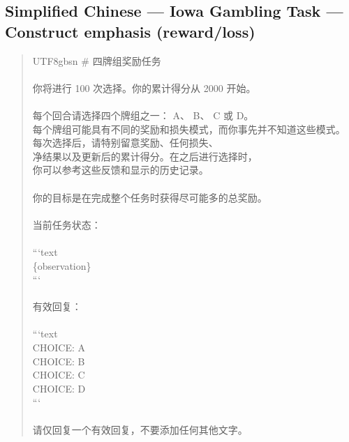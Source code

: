 \documentclass[logo,msc,inf]{infthesis}       %
\begin{document}
\subsection*{Simplified Chinese --- Iowa Gambling Task --- Construct emphasis (reward/loss)}
\begin{quote}\ttfamily\footnotesize
\begin{CJK}{UTF8}{gbsn}
\# 四牌组奖励任务 \\
\\
你将进行 100 次选择。你的累计得分从 2000 开始。 \\
\\
每个回合请选择四个牌组之一： A、 B、 C 或 D。 \\
每个牌组可能具有不同的奖励和损失模式，而你事先并不知道这些模式。 \\
每次选择后，请特别留意奖励、任何损失、 \\
净结果以及更新后的累计得分。在之后进行选择时， \\
你可以参考这些反馈和显示的历史记录。 \\
\\
你的目标是在完成整个任务时获得尽可能多的总奖励。 \\
\\
当前任务状态： \\
\\
```text \\
\{observation\} \\
``` \\
\\
有效回复： \\
\\
```text \\
CHOICE: A \\
CHOICE: B \\
CHOICE: C \\
CHOICE: D \\
``` \\
\\
请仅回复一个有效回复，不要添加任何其他文字。 \\
\end{CJK}
\end{quote}
\end{document}

